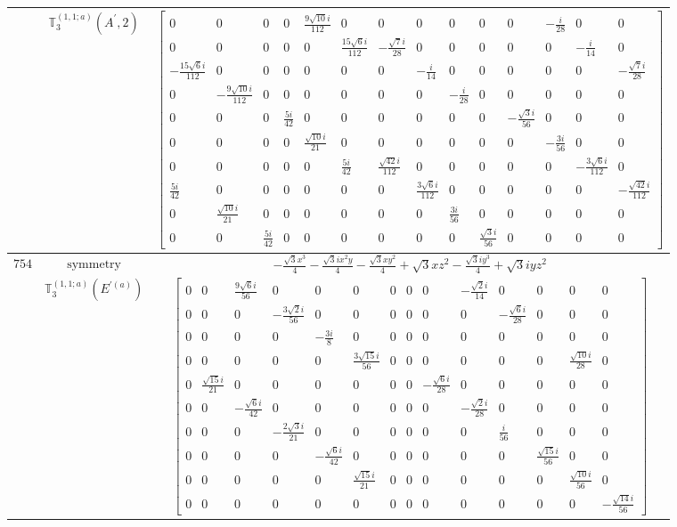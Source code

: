 \documentclass[fleqn,8pt,landscape]{jsarticle}
\begin{document}
\begin{longtable}{ccc}
$  $ & $ \mathbb{T}_{3}^{(1,1;a)}(A^{\prime},2) $ & $ \begin{bmatrix} 0 & 0 & 0 & 0 & \frac{9 \sqrt{10} i}{112} & 0 & 0 & 0 & 0 & 0 & 0 & - \frac{i}{28} & 0 & 0 \\ 0 & 0 & 0 & 0 & 0 & \frac{15 \sqrt{6} i}{112} & - \frac{\sqrt{7} i}{28} & 0 & 0 & 0 & 0 & 0 & - \frac{i}{14} & 0 \\ - \frac{15 \sqrt{6} i}{112} & 0 & 0 & 0 & 0 & 0 & 0 & - \frac{i}{14} & 0 & 0 & 0 & 0 & 0 & - \frac{\sqrt{7} i}{28} \\ 0 & - \frac{9 \sqrt{10} i}{112} & 0 & 0 & 0 & 0 & 0 & 0 & - \frac{i}{28} & 0 & 0 & 0 & 0 & 0 \\ 0 & 0 & 0 & \frac{5 i}{42} & 0 & 0 & 0 & 0 & 0 & 0 & - \frac{\sqrt{3} i}{56} & 0 & 0 & 0 \\ 0 & 0 & 0 & 0 & \frac{\sqrt{10} i}{21} & 0 & 0 & 0 & 0 & 0 & 0 & - \frac{3 i}{56} & 0 & 0 \\ 0 & 0 & 0 & 0 & 0 & \frac{5 i}{42} & \frac{\sqrt{42} i}{112} & 0 & 0 & 0 & 0 & 0 & - \frac{3 \sqrt{6} i}{112} & 0 \\ \frac{5 i}{42} & 0 & 0 & 0 & 0 & 0 & 0 & \frac{3 \sqrt{6} i}{112} & 0 & 0 & 0 & 0 & 0 & - \frac{\sqrt{42} i}{112} \\ 0 & \frac{\sqrt{10} i}{21} & 0 & 0 & 0 & 0 & 0 & 0 & \frac{3 i}{56} & 0 & 0 & 0 & 0 & 0 \\ 0 & 0 & \frac{5 i}{42} & 0 & 0 & 0 & 0 & 0 & 0 & \frac{\sqrt{3} i}{56} & 0 & 0 & 0 & 0 \end{bmatrix} $ \\ \hline
$ 754 $ & $ \text{symmetry} $ & $ - \frac{\sqrt{3} x^{3}}{4} - \frac{\sqrt{3} i x^{2} y}{4} - \frac{\sqrt{3} x y^{2}}{4} + \sqrt{3} x z^{2} - \frac{\sqrt{3} i y^{3}}{4} + \sqrt{3} i y z^{2} $ \\
$  $ & $ \mathbb{T}_{3}^{(1,1;a)}(E^{\prime(a)}) $ & $ \begin{bmatrix} 0 & 0 & \frac{9 \sqrt{6} i}{56} & 0 & 0 & 0 & 0 & 0 & 0 & - \frac{\sqrt{2} i}{14} & 0 & 0 & 0 & 0 \\ 0 & 0 & 0 & - \frac{3 \sqrt{2} i}{56} & 0 & 0 & 0 & 0 & 0 & 0 & - \frac{\sqrt{6} i}{28} & 0 & 0 & 0 \\ 0 & 0 & 0 & 0 & - \frac{3 i}{8} & 0 & 0 & 0 & 0 & 0 & 0 & 0 & 0 & 0 \\ 0 & 0 & 0 & 0 & 0 & \frac{3 \sqrt{15} i}{56} & 0 & 0 & 0 & 0 & 0 & 0 & \frac{\sqrt{10} i}{28} & 0 \\ 0 & \frac{\sqrt{15} i}{21} & 0 & 0 & 0 & 0 & 0 & 0 & - \frac{\sqrt{6} i}{28} & 0 & 0 & 0 & 0 & 0 \\ 0 & 0 & - \frac{\sqrt{6} i}{42} & 0 & 0 & 0 & 0 & 0 & 0 & - \frac{\sqrt{2} i}{28} & 0 & 0 & 0 & 0 \\ 0 & 0 & 0 & - \frac{2 \sqrt{3} i}{21} & 0 & 0 & 0 & 0 & 0 & 0 & \frac{i}{56} & 0 & 0 & 0 \\ 0 & 0 & 0 & 0 & - \frac{\sqrt{6} i}{42} & 0 & 0 & 0 & 0 & 0 & 0 & \frac{\sqrt{15} i}{56} & 0 & 0 \\ 0 & 0 & 0 & 0 & 0 & \frac{\sqrt{15} i}{21} & 0 & 0 & 0 & 0 & 0 & 0 & \frac{\sqrt{10} i}{56} & 0 \\ 0 & 0 & 0 & 0 & 0 & 0 & 0 & 0 & 0 & 0 & 0 & 0 & 0 & - \frac{\sqrt{14} i}{56} \end{bmatrix} $ \\ \hline

\end{longtable}
\end{document}
